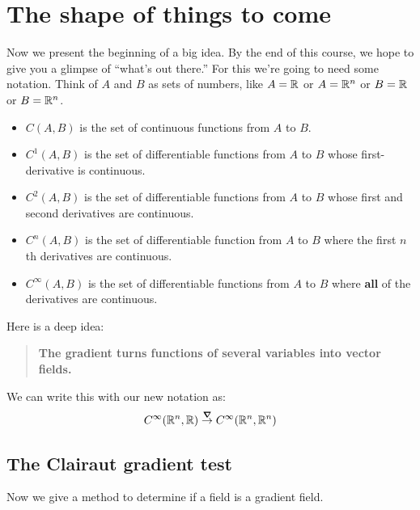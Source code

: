 \documentclass{ximera}
\begin{document}
\section{The shape of things to come}

Now we present the beginning of a big idea. By the end of this course,
we hope to give you a glimpse of ``what's out there.'' For this we're
going to need some notation. Think of $A$ and $B$ as sets of numbers,
like $A=\mathbb R$ or $A=\mathbb R^n$ or $B=\mathbb R$ or $B=\mathbb R^n$.

\begin{itemize}
\item $C(A,B)$ is the set of continuous functions from $A$ to $B$.
\item $C^1(A,B)$ is the set of  differentiable functions from $A$ to $B$ whose
  first-derivative is continuous.
\item $C^2(A,B)$ is the set of  differentiable functions from $A$ to $B$ whose
  first and second derivatives are continuous.
\item $C^n(A,B)$ is the set of differentiable function from $A$ to $B$
  where the first $n$th derivatives are continuous.
\item $C^\infty(A,B)$ is the set of differentiable functions from $A$
  to $B$ where \textbf{all} of the derivatives are continuous.
\end{itemize}
Here is a deep idea:
\begin{quote}
  \textbf{The gradient turns functions of several variables into vector fields.}
\end{quote}
We can write this with our new notation as:
\[
C^\infty(\mathbb R^n,\mathbb R)\overset{\boldsymbol\nabla}{\to}C^\infty(\mathbb R^n,\mathbb R^n)
\]


\subsection{The Clairaut gradient test}


Now we give a method to determine if a field is a gradient field.
\end{document}

